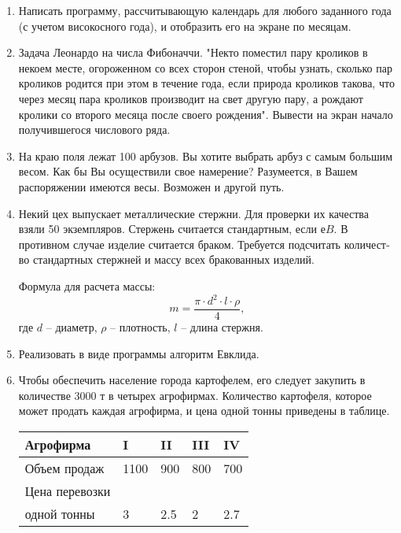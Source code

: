 \begin{enumerate}  
  \item Написать программу, рассчитывающую календарь для любого заданного года (с учетом високосного года), и отобразить его на экране по месяцам.

  \item Задача Леонардо на числа Фибоначчи. "Некто поместил пару кроликов в некоем месте, огороженном со всех сторон стеной, чтобы узнать, сколько пар кроликов родится при этом в течение года, если природа кроликов такова, что через месяц пара кроликов производит на свет другую пару, а рождают кролики со второго месяца после своего рождения". Вывести на экран начало получив­шегося числового ряда.

  \item На краю поля лежат 100 арбузов. Вы хотите выбрать арбуз с самым большим весом. Как бы Вы осуществили свое намерение? Разумеется, в Вашем распоряжении имеются весы. Возможен и другой путь.
    
  \item Некий цех выпускает металлические стержни. Для проверки их качества взяли 50 экземпляров. Стержень считается стандартным, если е$B$. В противном случае изделие считается браком. Требуется подсчитать количест­во стандартных стержней и массу всех бракованных изделий.

Формула для расчета массы:   $$m = \frac{\pi\cdot d^2\cdot l\cdot \rho}{4}, $$
где $d$ -- диаметр, $\rho$ -- плотность,   $l$ -- длина стержня.

  \item Реализовать в виде программы алгоритм Евклида.

  \item Чтобы обеспечить население города картофелем, его следу­ет закупить в количестве 3000 т в четырех агрофирмах. Количест­во картофеля, которое может продать каждая агрофирма, и цена одной тонны приведены в таблице.

\begin{center}
\begin{tabular}{ | l | l | l |  l |  l |} \hline
Агрофирма & I  &  II  &  III  &  IV   \\   \hline
Объем продаж & 1100  &  900  &  800  &  700   \\   \hline
Цена перевозки &    &     &     &      \\   
одной тонны & 3  &  2.5  &  2  &  2.7     \\   \hline
\end{tabular}
\end{center}
\vspace{5mm}


\end{enumerate}
